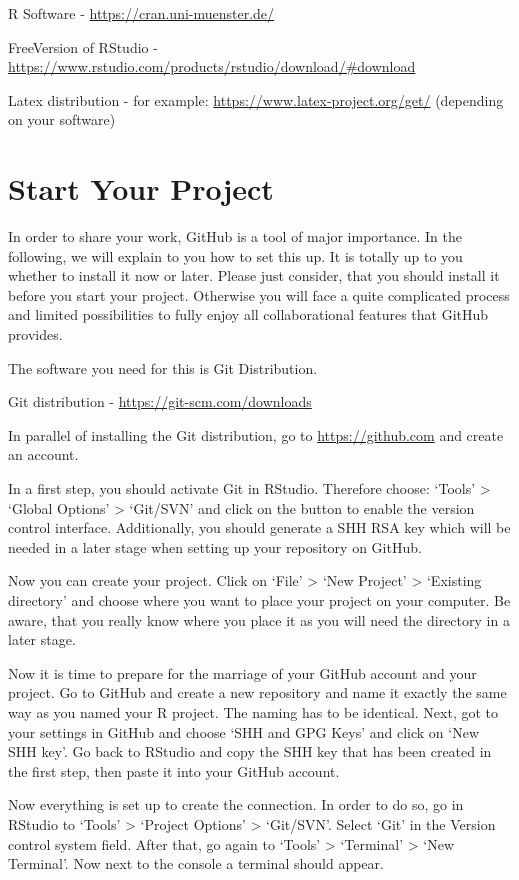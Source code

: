 \documentclass[]{report}
\begin{document}
R Software - \url{https://cran.uni-muenster.de/}

FreeVersion of RStudio -
\url{https://www.rstudio.com/products/rstudio/download/\#download}

Latex distribution - for example:
\url{https://www.latex-project.org/get/} (depending on your software)

\section{Start Your Project}\label{start-your-project}

In order to share your work, GitHub is a tool of major importance. In
the following, we will explain to you how to set this up. It is totally
up to you whether to install it now or later. Please just consider, that
you should install it before you start your project. Otherwise you will
face a quite complicated process and limited possibilities to fully
enjoy all collaborational features that GitHub provides.

The software you need for this is Git Distribution.

Git distribution - \url{https://git-scm.com/downloads}

In parallel of installing the Git distribution, go to
\url{https://github.com} and create an account.

In a first step, you should activate Git in RStudio. Therefore choose:
`Tools' \textgreater{} `Global Options' \textgreater{} `Git/SVN' and
click on the button to enable the version control interface.
Additionally, you should generate a SHH RSA key which will be needed in
a later stage when setting up your repository on GitHub.

Now you can create your project. Click on `File' \textgreater{} `New
Project' \textgreater{} `Existing directory' and choose where you want
to place your project on your computer. Be aware, that you really know
where you place it as you will need the directory in a later stage.

Now it is time to prepare for the marriage of your GitHub account and
your project. Go to GitHub and create a new repository and name it
exactly the same way as you named your R project. The naming has to be
identical. Next, got to your settings in GitHub and choose `SHH and GPG
Keys' and click on `New SHH key'. Go back to RStudio and copy the SHH
key that has been created in the first step, then paste it into your
GitHub account.

Now everything is set up to create the connection. In order to do so, go
in RStudio to `Tools' \textgreater{} `Project Options' \textgreater{}
`Git/SVN'. Select `Git' in the Version control system field. After that,
go again to `Tools' \textgreater{} `Terminal' \textgreater{} `New
Terminal'. Now next to the console a terminal should appear.
\end{document}
